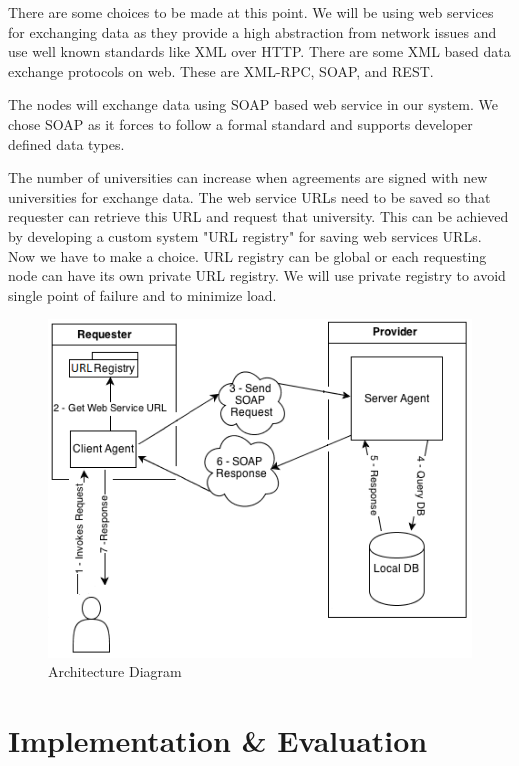 \documentclass[12pt,a4paper,oneside]{book}
\begin{document}
There are some choices to be made at this point. We will be using web services for exchanging data as they provide a high abstraction from network issues and use well known standards like XML over HTTP. There are some XML based data exchange protocols on web. These are XML-RPC, SOAP, and REST.

The nodes will exchange data using SOAP based web service in our system.  We chose SOAP as it forces to follow a formal standard and supports developer defined data types.

The number of universities can increase when agreements are signed with new universities for exchange data. The web service URLs need to be saved so that requester can retrieve this URL and request that university. This can be achieved by developing a custom system "URL registry" for saving web services URLs. Now we have to make a choice. URL registry can be global or each requesting node can have its own private URL registry. We will use private registry to avoid single point of failure and to minimize load.

\begin{figure}[!htp]
  \centering
  \includegraphics[width=12cm]{architecture.png}
  \caption{Architecture Diagram}
  \label{fig:architecture}
\end{figure}


\chapter{Implementation \& Evaluation}\label{ch-implement}
\end{document}
